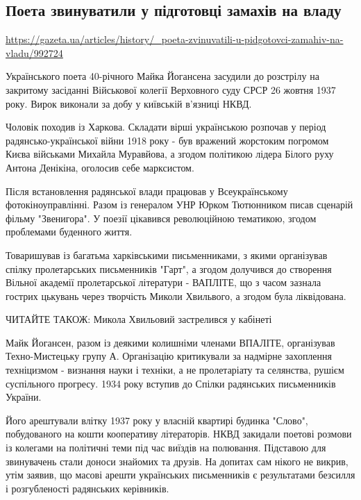  
 

\subsection{Поета звинуватили у підготовці замахів на владу}
\label{sec:24_10_2020.news.ua.gazeta.1.mike_jogansen_shoot}

\url{https://gazeta.ua/articles/history/_poeta-zvinuvatili-u-pidgotovci-zamahiv-na-vladu/992724}

Українського поета 40-річного Майка Йогансена засудили до розстрілу на
закритому засіданні Військової колегії Верховного суду СРСР 26 жовтня 1937
року. Вирок виконали за добу у київській в'язниці НКВД.

Чоловік походив із Харкова. Складати вірші українською розпочав у період
радянсько-української війни 1918 року - був вражений жорстоким погромом Києва
військами Михайла Муравйова, а згодом політикою лідера Білого руху Антона
Денікіна, оголосив себе марксистом.

Після встановлення радянської влади працював у Всеукраїнському
фотокіноуправлінні. Разом із генералом УНР Юрком Тютюнником писав сценарій
фільму "Звенигора". У поезії цікавився революційною тематикою, згодом
проблемами буденного життя.

Товаришував із багатьма харківськими письменниками, з якими організував спілку
пролетарських письменників "Гарт", а згодом долучився до створення Вільної
академії пролетарської літератури - ВАПЛІТЕ, що з часом зазнала гострих
цькувань через творчість Миколи Хвильвого, а згодом була ліквідована.

ЧИТАЙТЕ ТАКОЖ: Микола Хвильовий застрелився у кабінеті

Майк Йогансен, разом із деякими колишніми членами ВПАЛІТЕ, організував
Техно-Мистецьку групу А. Організацію критикували за надмірне захоплення
техніцизмом - визнання науки і техніки, а не пролетаріату та селянства, рушієм
суспільного прогресу. 1934 року вступив до Спілки радянських письменників
України.

Його арештували влітку 1937 року у власній квартирі будинка "Слово",
побудованого на кошти кооперативу літераторів. НКВД закидали поетові розмови із
колегами на політичні теми під час виїздів на полювання. Підставою для
звинувачень стали доноси знайомих та друзів. На допитах сам нікого не викрив,
утім заявив, що масові арешти українських письменників є результатами безсилля
і розгубленості радянських керівників.

